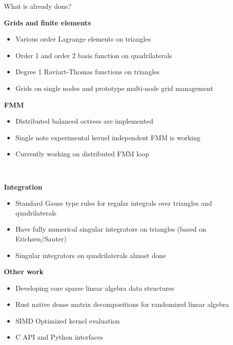 \documentclass[dvipsnames,10pt]{beamer}
\begin{document}
\begin{frame}{What is already done?}
\begin{minipage}{5cm}
\tiny
\textbf{Grids and finite elements}\\
\begin{itemize}
\item Various order Lagrange elements on triangles
\item Order 1 and order 2 basis function on quadrilaterals
\item Degree 1 Raviart-Thomas functions on triangles
\item Grids on single nodes and prototype multi-node grid management
\end{itemize}
\end{minipage}
\begin{minipage}{5cm}
\tiny
\textbf{FMM}\\
\begin{itemize}
\item Distributed balanced octrees are implemented
\item Single note experimental kernel independent FMM is working
\item Currently working on distributed FMM loop
\end{itemize}
\end{minipage}\\

\vspace{\baselineskip}

\begin{minipage}{5cm}
\tiny
\textbf{Integration}\\
\begin{itemize}
\item Standard Gauss type rules for regular integrals over triangles and quadrilaterals
\item Have fully numerical singular integrators on triangles (based on Erichsen/Sauter)
\item Singular integrators on quadrilaterals almost done
\end{itemize}
\end{minipage}
\begin{minipage}{5cm}
\tiny
\textbf{Other work}\\
\begin{itemize}
\item Developing core sparse linear algebra data structures
\item Rust native dense matrix decompositions for randomized linear algebra
\item SIMD Optimized kernel evaluation
\item C API and Python interfaces
\end{itemize}
\end{minipage}\\




\end{frame}
\end{document}
